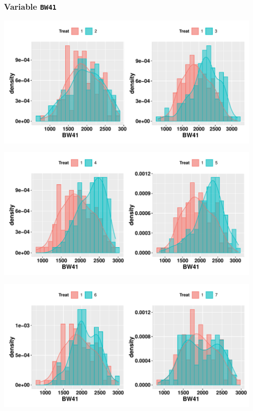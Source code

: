 \documentclass[11pt,a4paper]{article}\usepackage[]{graphicx}\usepackage[]{color}
\makeatletter
\def\maxwidth{ %
  \ifdim\Gin@nat@width>\linewidth
    \linewidth
  \else
    \Gin@nat@width
  \fi
}
\newenvironment{knitrout}{}{} %
\makeatother
\begin{document}
\subsubsection{Variable \texttt{BW41}}
\begin{knitrout}
\color{fgcolor}
\includegraphics[width=\maxwidth]{figure/unnamed-chunk-11-1} 

\includegraphics[width=\maxwidth]{figure/unnamed-chunk-11-2} 

\includegraphics[width=\maxwidth]{figure/unnamed-chunk-11-3} 

\end{knitrout}
\end{document}

